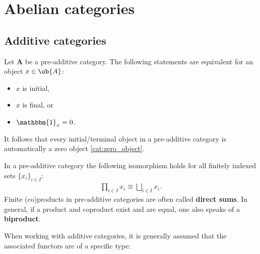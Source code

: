\section{Abelian categories}\label{section:abelian_categories}
\subsection{Additive categories}


    \begin{property}
        Let $\mathbf{A}$ be a pre-additive category. The following statements are equivalent for an object $x\in\ob{A}$:
        \begin{itemize}
            \item $x$ is initial,
            \item $x$ is final, or
            \item $\mathbbm{1}_x = 0$.
        \end{itemize}
        It follows that every initial/terminal object in a pre-additive category is automatically a zero object \ref{cat:zero_object}.
    \end{property}
    \begin{property}[Biproducts]
        In a pre-additive category the following isomorphism holds for all finitely indexed sets $\{x_i\}_{i\in I}$:
        \begin{gather}
            \prod_{i\in I}x_i\cong\bigsqcup_{i\in I}x_i.
        \end{gather}
        Finite (co)products in pre-additive categories are often called \textbf{direct sums}. In general, if a product and coproduct exist and are equal, one also speaks of a \textbf{biproduct}.
    \end{property}


    When working with additive categories, it is generally assumed that the associated functors are of a specific type:

